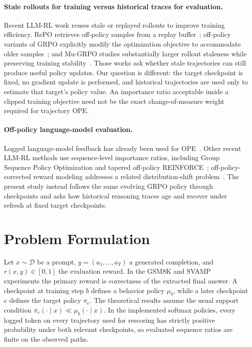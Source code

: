 \documentclass[10pt]{article}
\theoremstyle{remark}
\begin{document}
\paragraph{Stale rollouts for training versus historical traces for evaluation.}
Recent LLM-RL work reuses stale or replayed rollouts to improve training efficiency. RePO retrieves off-policy samples from a replay buffer~\cite{li2025repo}; off-policy variants of GRPO explicitly modify the optimization objective to accommodate older samples~\cite{mroueh2025grpo}; and Mu-GRPO studies substantially larger rollout staleness while preserving training stability~\cite{tian2026mugrpo}. Those works ask whether stale trajectories can still produce useful policy updates. Our question is different: the target checkpoint is fixed, no gradient update is performed, and historical trajectories are used only to estimate that target's policy value. An importance ratio acceptable inside a clipped training objective need not be the exact change-of-measure weight required for trajectory OPE.

\paragraph{Off-policy language-model evaluation.}
Logged language-model feedback has already been used for OPE~\cite{bhargava2024ope}. Other recent LLM-RL methods use sequence-level importance ratios, including Group Sequence Policy Optimization and tapered off-policy REINFORCE~\cite{zheng2025gspo,leroux2025topr}; off-policy-corrected reward modeling addresses a related distribution-shift problem~\cite{ackermann2025ocrm}. The present study instead follows the same evolving GRPO policy through checkpoints and asks how historical reasoning traces age and recover under refresh at fixed target checkpoints.

\section{Problem Formulation}
Let $x\sim\mathcal D$ be a prompt, $y=(a_1,\ldots,a_T)$ a generated completion, and $r(x,y)\in[0,1]$ the evaluation reward. In the GSM8K and SVAMP experiments the primary reward is correctness of the extracted final answer. A checkpoint at training step $b$ defines a behavior policy $\mu_b$, while a later checkpoint $e$ defines the target policy $\pi_e$. The theoretical results assume the usual support condition $\pi_e(\cdot\mid x)\ll\mu_b(\cdot\mid x)$. In the implemented softmax policies, every logged token on every trajectory used for rescoring has strictly positive probability under both relevant checkpoints, so evaluated sequence ratios are finite on the observed paths.
\end{document}
